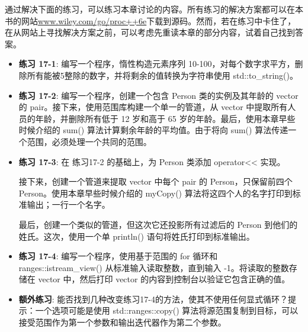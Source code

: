 通过解决下面的练习，可以练习本章讨论的内容。所有练习的解决方案都可以在本书的网站\url{www.wiley.com/go/proc++6e}下载到源码。然而，若在练习中卡住了，在从网站上寻找解决方案之前，可以考虑先重读本章的部分内容，试着自己找到答案。

\begin{itemize}
\item
\textbf{练习 17-1}: 编写一个程序，惰性构造元素序列 10-100，对每个数字求平方，删除所有能被5整除的数字，并将剩余的值转换为字符串使用 std::to\_string()。

\item
\textbf{练习 17-2}: 编写一个程序，创建一个包含 Person 类的实例及其年龄的 vector 的 pair。接下来，使用范围库构建一个单一的管道，从 vector 中提取所有人员的年龄，并删除所有低于 12 岁和高于 65 岁的年龄。最后，使用本章早些时候介绍的 sum() 算法计算剩余年龄的平均值。由于将向 sum() 算法传递一个范围，必须处理一个共同的范围。

\item
\textbf{练习 17-3}: 在 练习17-2 的基础上，为 Person 类添加 operator<{}< 实现。

接下来，创建一个管道来提取 vector 中每个 pair 的 Person，只保留前四个 Person。使用本章早些时候介绍的 myCopy() 算法将这四个人的名字打印到标准输出；一行一个名字。

最后，创建一个类似的管道，但这次它还投影所有过滤后的 Person 到他们的姓氏。这次，使用一个单 println() 语句将姓氏打印到标准输出。

\item
\textbf{练习 17-4}: 编写一个程序，使用基于范围的 for 循环和 ranges::istream\_view() 从标准输入读取整数，直到输入 -1。将读取的整数存储在 vector 中，然后打印 vector 的内容到控制台以验证它包含正确的值。

\item
\textbf{额外练习}: 能否找到几种改变练习17-4的方法，使其不使用任何显式循环？提示：一个选项可能是使用 std::ranges::copy() 算法将源范围复制到目标，可以接受范围作为第一个参数和输出迭代器作为第二个参数。
\end{itemize}




